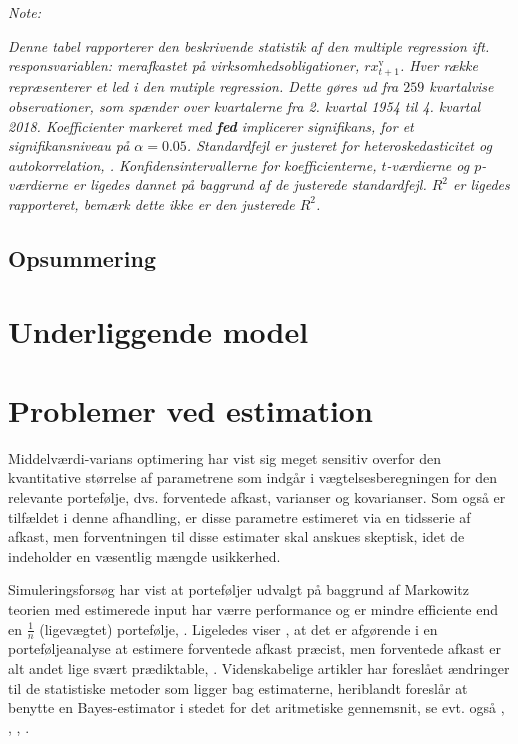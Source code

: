 \documentclass[
  a4paper,
  oneside]{memoir}
\begin{document}
\begin{table}[!h]
\begin{threeparttable}
\begin{tablenotes}
\item \textit{Note: } 
\item \textit{Denne tabel rapporterer den beskrivende statistik af den multiple regression ift. responsvariablen: merafkastet på virksomhedsobligationer, $rx_{t+1}^{\text{v}}$. Hver række repræsenterer et led i den mutiple regression. Dette gøres ud fra $259$ kvartalvise observationer, som spænder over kvartalerne fra 2. kvartal 1954 til 4. kvartal 2018. Koefficienter markeret med \textbf{fed} implicerer signifikans, for et signifikansniveau på $\alpha=0.05$. Standardfejl er justeret for heteroskedasticitet og autokorrelation, \citep{Newey1987}. Konfidensintervallerne for koefficienterne, $t$-værdierne og $p$-værdierne er ligedes dannet på baggrund af de justerede standardfejl. $R^2$ er ligedes rapporteret, bemærk dette ikke er den justerede $R^2$.}
\end{tablenotes}
\end{threeparttable}
\end{table}

\hypertarget{opsreg}{%
\section{Opsummering}\label{opsreg}}

\hypertarget{underliggende-model}{%
\chapter{Underliggende model}\label{underliggende-model}}

\hypertarget{problemer-ved-estimation}{%
\chapter{Problemer ved estimation}\label{problemer-ved-estimation}}

Middelværdi-varians optimering har vist sig meget sensitiv overfor den kvantitative størrelse af parametrene som indgår i vægtelsesberegningen for den relevante portefølje, dvs. forventede afkast, varianser og kovarianser. Som også er tilfældet i denne afhandling, er disse parametre estimeret via en tidsserie af afkast, men forventningen til disse estimater skal anskues skeptisk, idet de indeholder en væsentlig mængde usikkerhed.

Simuleringsforsøg har vist at porteføljer udvalgt på baggrund af Markowitz teorien med estimerede input har værre performance og er mindre efficiente end en \(\tfrac{1}{n}\) (ligevægtet) portefølje, \citep{Frankfurter1971}. Ligeledes viser \citep{Chopra1993}, at det er afgørende i en porteføljeanalyse at estimere forventede afkast præcist, men forventede afkast er alt andet lige svært prædiktable, \citep{Merton1980}. Videnskabelige artikler har foreslået ændringer til de statistiske metoder som ligger bag estimaterne, heriblandt foreslår \citep{Jorion1986} at benytte en Bayes-estimator i stedet for det aritmetiske gennemsnit, se evt. også \citep{MacKinlay2000}, \citep{Garlappi2007}, \citep{Kan2007}, \citep{Tu2011}.
\end{document}

